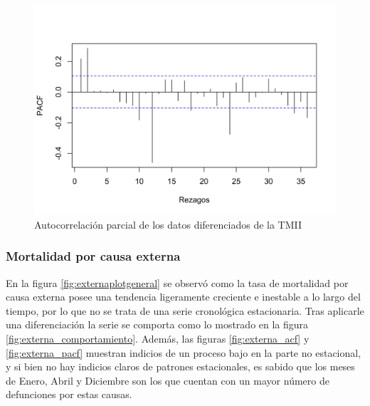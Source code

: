 \documentclass[
]{article}
\begin{document}
\begin{figure}[H]
\includegraphics[width=1\linewidth,height=1\textheight]{Tesis_files/figure-latex/tmii_pacf-1} \caption{Autocorrelación parcial de los datos diferenciados de la TMII}\label{fig:tmii_pacf}
\end{figure}

\subsubsection{Mortalidad por causa externa}

En la figura \ref{fig:externaplotgeneral} se observó como la tasa de
mortalidad por causa externa posee una tendencia ligeramente creciente e
inestable a lo largo del tiempo, por lo que no se trata de una serie
cronológica estacionaria. Tras aplicarle una diferenciación la serie se
comporta como lo mostrado en la figura \ref{fig:externa_comportamiento}.
Además, las figuras \ref{fig:externa_acf} y \ref{fig:externa_pacf}
muestran indicios de un proceso bajo en la parte no estacional, y si
bien no hay indicios claros de patrones estacionales, es sabido que los
meses de Enero, Abril y Diciembre son los que cuentan con un mayor
número de defunciones por estas causas.
\end{document}
